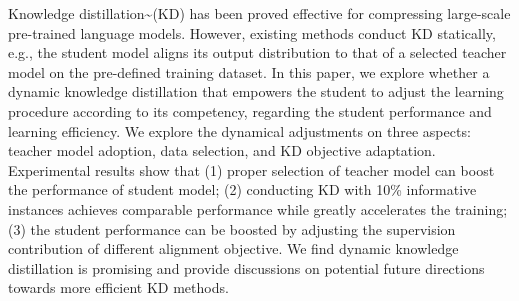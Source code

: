 Knowledge distillation{\textasciitilde}(KD) has been proved effective for compressing large-scale pre-trained language models. However, existing methods conduct KD statically, e.g., the student model aligns its output distribution to that of a selected teacher model on the pre-defined training dataset. In this paper, we explore whether a dynamic knowledge distillation that empowers the student to adjust the learning procedure according to its competency, regarding the student performance and learning efficiency. We explore the dynamical adjustments on three aspects: teacher model adoption, data selection, and KD objective adaptation. Experimental results show that (1) proper selection of teacher model can boost the performance of student model; (2) conducting KD with 10\% informative instances achieves comparable performance while greatly accelerates the training; (3) the student performance can be boosted by adjusting the supervision contribution of different alignment objective. We find dynamic knowledge distillation is promising and provide discussions on potential future directions towards more efficient KD methods.
